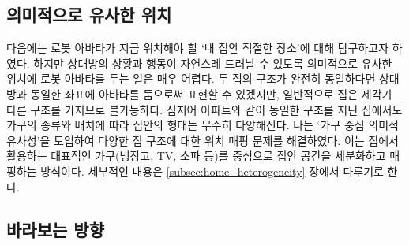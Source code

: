 


\subsection{의미적으로 유사한 위치}

다음에는 로봇 아바타가 지금 위치해야 할 `내 집안 적절한 장소'에 대해 탐구하고자 하였다. 하지만 상대방의 상황과 행동이 자연스레 드러날 수 있도록 의미적으로 유사한 위치에 로봇 아바타를 두는 일은 매우 어렵다. 두 집의 구조가 완전히 동일하다면 상대방과 동일한 좌표에 아바타를 둠으로써 표현할 수 있겠지만, 일반적으로 집은 제각기 다른 구조를 가지므로 불가능하다. 심지어 아파트와 같이 동일한 구조를 지닌 집에서도 가구의 종류와 배치에 따라 집안의 형태는 무수히 다양해진다. 나는 `가구 중심 의미적 유사성'을 도입하여 다양한 집 구조에 대한 위치 매핑 문제를 해결하였다. 이는 집에서 활용하는 대표적인 가구(냉장고, TV, 소파 등)를 중심으로 집안 공간을 세분화하고 매핑하는 방식이다. 세부적인 내용은 \ref{subsec:home_heterogeneity} 장에서 다루기로 한다.


\subsection{바라보는 방향}


